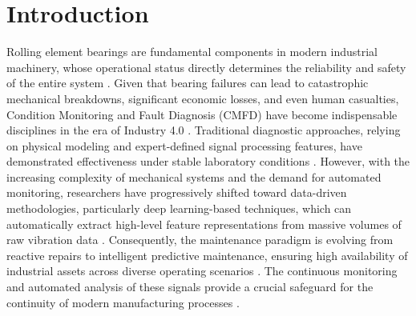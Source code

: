 \section{Introduction}
\label{sec:introduction}

Rolling element bearings are fundamental components in modern industrial machinery, whose operational status directly determines the reliability and safety of the entire system \cite{lei2020deep_fault, jia2016sae_bearing, lei2020deep_fault}. Given that bearing failures can lead to catastrophic mechanical breakdowns, significant economic losses, and even human casualties, Condition Monitoring and Fault Diagnosis (CMFD) have become indispensable disciplines in the era of Industry 4.0 \cite{smith_cwru, zhang2021cwru_review, jia2016sae_bearing}. Traditional diagnostic approaches, relying on physical modeling and expert-defined signal processing features, have demonstrated effectiveness under stable laboratory conditions \cite{samanta2006svm_bearing, saidi2022triplet_svm, support2019svm_bearing, samanta2006svm_bearing}. However, with the increasing complexity of mechanical systems and the demand for automated monitoring, researchers have progressively shifted toward data-driven methodologies, particularly deep learning-based techniques, which can automatically extract high-level feature representations from massive volumes of raw vibration data \cite{chen2023cwru_deep, chen2021sae_fault, shao2018sae_bearing, chen2021sae_fault}. Consequently, the maintenance paradigm is evolving from reactive repairs to intelligent predictive maintenance, ensuring high availability of industrial assets across diverse operating scenarios \cite{lei2020deep_fault, chen2023cwru_deep, zhang2021cwru_review, lei2020deep_fault}. The continuous monitoring and automated analysis of these signals provide a crucial safeguard for the continuity of modern manufacturing processes \cite{smith_cwru, jia2016sae_bearing}.

